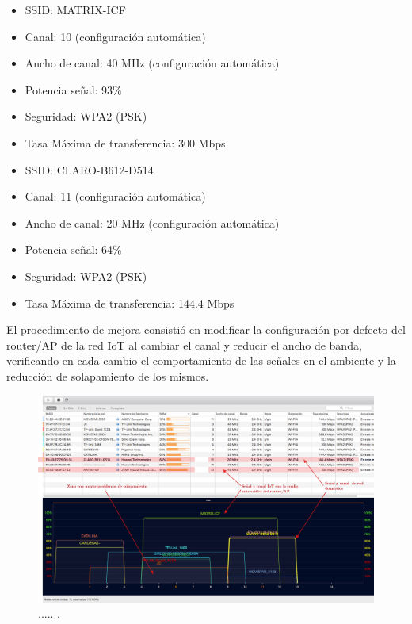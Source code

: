\begin{itemize}
\item SSID: MATRIX-ICF
\item Canal: 10 (configuración automática)
\item Ancho de canal: 40 MHz (configuración automática)
\item Potencia señal: 93\%
\item Seguridad:  WPA2 (PSK)
\item Tasa Máxima de transferencia: 300 Mbps
\end{itemize}


\begin{itemize} 
\item SSID: CLARO-B612-D514
\item Canal: 11 (configuración automática)
\item Ancho de canal: 20 MHz (configuración automática)
\item Potencia señal: 64\%
\item Seguridad: WPA2 (PSK)
\item Tasa Máxima de transferencia: 144.4 Mbps
\end{itemize}

El procedimiento de mejora consistió en modificar la configuración por defecto del router/AP de la red IoT al cambiar el canal y reducir el ancho de banda, verificando en cada cambio el comportamiento de las señales en el ambiente y la reducción de solapamiento de los mismos.

\begin{landscape} %
\begin{figure}[htpb]
\centering 
\includegraphics[width=1.5\textwidth]{./Figures/wifi/01.png}
\caption{..... .}
\label{fig:test01}
\end{figure}
\end{landscape} %

